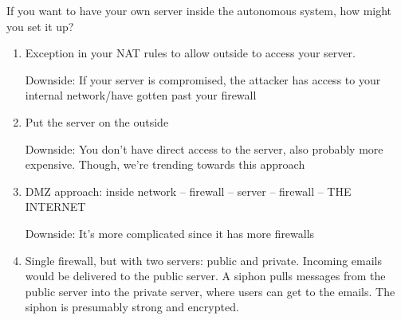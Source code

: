 
If you want to have your own server inside the autonomous system, how might you set it up?
\begin{enumerate}	
	\item Exception in your NAT rules to allow outside to access your server.

		Downside: If your server is compromised, the attacker has access to your internal network/have gotten past your firewall
	\item Put the server on the outside

		Downside: You don't have direct access to the server, also probably more expensive. Though, we're trending towards this approach
	\item DMZ approach: inside network -- firewall -- server -- firewall -- THE INTERNET

		Downside: It's more complicated since it has more firewalls
	\item Single firewall, but with two servers: public and private. Incoming emails would be delivered to the public server. A siphon pulls messages from the public server into the private server, where users can get to the emails. The siphon is presumably strong and encrypted.
\end{enumerate}